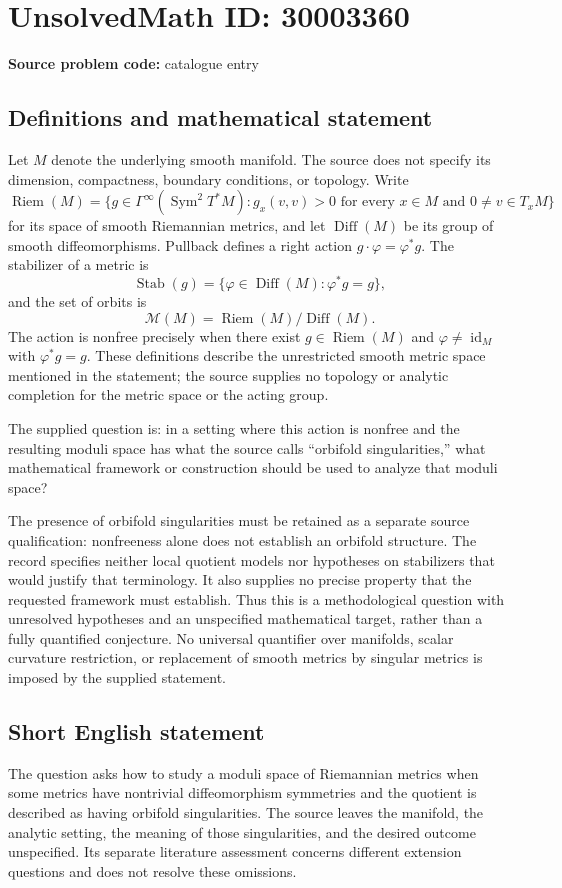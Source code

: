 \documentclass[11pt]{article}
\begin{document}
\section*{UnsolvedMath ID: 30003360}
\textbf{Source problem code:} catalogue entry
\subsection{Definitions and mathematical statement}
Let \(M\) denote the underlying smooth manifold. The source does not specify its dimension, compactness, boundary conditions, or topology. Write
\[
\operatorname{Riem}(M)=\{g\in\Gamma^{\infty}(\operatorname{Sym}^{2}T^{*}M):g_x(v,v)>0\text{ for every }x\in M\text{ and }0\ne v\in T_xM\}
\]
for its space of smooth Riemannian metrics, and let \(\operatorname{Diff}(M)\) be its group of smooth diffeomorphisms. Pullback defines a right action \(g\cdot\varphi=\varphi^{*}g\). The stabilizer of a metric is
\[
\operatorname{Stab}(g)=\{\varphi\in\operatorname{Diff}(M):\varphi^{*}g=g\},
\]
and the set of orbits is
\[
\mathcal M(M)=\operatorname{Riem}(M)/\operatorname{Diff}(M).
\]
The action is nonfree precisely when there exist \(g\in\operatorname{Riem}(M)\) and \(\varphi\ne\operatorname{id}_M\) with \(\varphi^{*}g=g\). These definitions describe the unrestricted smooth metric space mentioned in the statement; the source supplies no topology or analytic completion for the metric space or the acting group.

The supplied question is: in a setting where this action is nonfree and the resulting moduli space has what the source calls ``orbifold singularities,'' what mathematical framework or construction should be used to analyze that moduli space?

The presence of orbifold singularities must be retained as a separate source qualification: nonfreeness alone does not establish an orbifold structure. The record specifies neither local quotient models nor hypotheses on stabilizers that would justify that terminology. It also supplies no precise property that the requested framework must establish. Thus this is a methodological question with unresolved hypotheses and an unspecified mathematical target, rather than a fully quantified conjecture. No universal quantifier over manifolds, scalar curvature restriction, or replacement of smooth metrics by singular metrics is imposed by the supplied statement.
\subsection{Short English statement}
The question asks how to study a moduli space of Riemannian metrics when some metrics have nontrivial diffeomorphism symmetries and the quotient is described as having orbifold singularities. The source leaves the manifold, the analytic setting, the meaning of those singularities, and the desired outcome unspecified. Its separate literature assessment concerns different extension questions and does not resolve these omissions.
\end{document}
